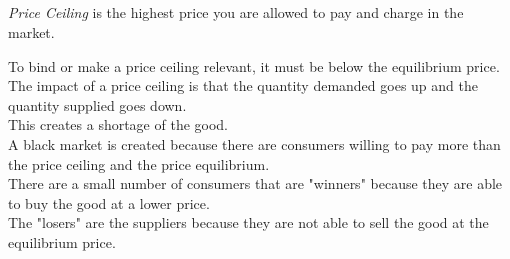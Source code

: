\subsection{}
\begin{definition}
    \emph{Price Ceiling} is the highest price you are allowed to pay and charge in the market.
\end{definition}
To bind or make a price ceiling relevant, it must be below the equilibrium price.\\
The impact of a price ceiling is that the quantity demanded goes up and the quantity supplied goes down.\\
This creates a shortage of the good.\\
A black market is created because there are consumers willing to pay more than the price ceiling and the price equilibrium.\\
There are a small number of consumers that are "winners" because they are able to buy the good at a lower price.\\
The "losers" are the suppliers because they are not able to sell the good at the equilibrium price.